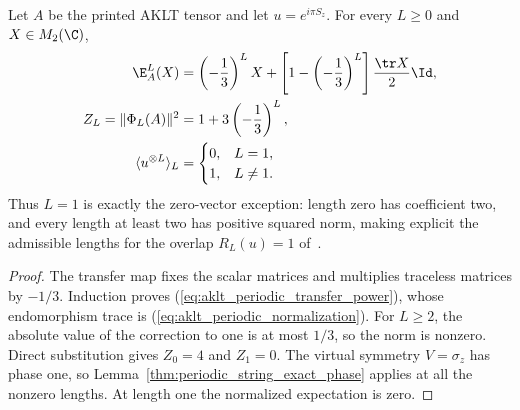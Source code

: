 \begin{lemma}
    \label{thm:aklt_periodic_string_exact}
    \leanok
    Let $A$ be the printed AKLT tensor and let $u=e^{i\pi S_z}$.
    For every $L\geq0$ and $X\in M_2(\C)$,
    \begin{align}
        \E_A^L(X)
         & =\left(-\frac13\right)^L X
        +\left[1-\left(-\frac13\right)^L\right]
        \frac{\tr X}{2}\Id,\label{eq:aklt_periodic_transfer_power}            \\
        Z_L=\|\Phi_L(A)\|^2
         & =1+3\left(-\frac13\right)^L,\label{eq:aklt_periodic_normalization} \\
        \langle u^{\otimes L}\rangle_L
         & =\begin{cases}0,&L=1,\\1,&L\ne1.\end{cases}
        \label{eq:aklt_periodic_full_ring}
    \end{align}
    Thus $L=1$ is exactly the zero-vector exception: length zero has
    coefficient two, and every length at least two has positive squared norm,
    making explicit the admissible lengths for the overlap $R_L(u)=1$
    of~\cite[line~399]{PerezGarcia2008StringOrder}.
\end{lemma}
\begin{proof}
    The transfer map fixes the scalar matrices and multiplies traceless
    matrices by $-1/3$. Induction proves
    (\ref{eq:aklt_periodic_transfer_power}), whose endomorphism trace is
    (\ref{eq:aklt_periodic_normalization}). For $L\geq2$, the absolute value
    of the correction to one is at most $1/3$, so the norm is nonzero.
    Direct substitution gives $Z_0=4$ and $Z_1=0$.
    The virtual symmetry $V=\sigma_z$ has phase one, so
    Lemma~\ref{thm:periodic_string_exact_phase} applies at all the nonzero
    lengths. At length one the normalized expectation is zero.
\end{proof}

